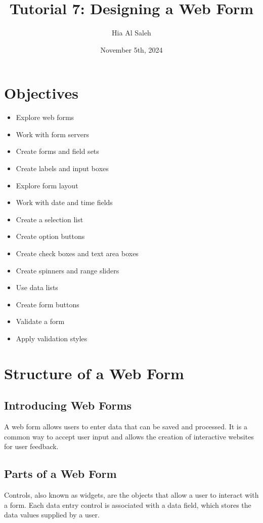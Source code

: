 \documentclass{article}
\title{Tutorial 7: Designing a Web Form}
\author{Hia Al Saleh}
\date{November 5th, 2024}
\begin{document}
\maketitle
\tableofcontents
\newpage 

\section{Objectives}
\begin{itemize}
    \item Explore web forms
    \item Work with form servers
    \item Create forms and field sets
    \item Create labels and input boxes
    \item Explore form layout
    \item Work with date and time fields
    \item Create a selection list
    \item Create option buttons
    \item Create check boxes and text area boxes
    \item Create spinners and range sliders
    \item Use data lists
    \item Create form buttons
    \item Validate a form
    \item Apply validation styles
\end{itemize}

\section{Structure of a Web Form}
\subsection{Introducing Web Forms}
A web form allows users to enter data that can be saved and processed. It is a common way to accept user input and allows the creation of interactive websites for user feedback.

\subsection{Parts of a Web Form}
Controls, also known as widgets, are the objects that allow a user to interact with a form. Each data entry control is associated with a data field, which stores the data values supplied by a user.
\end{document}
